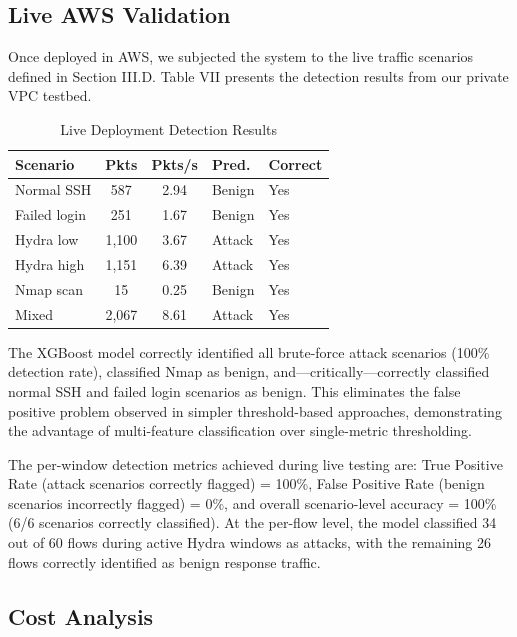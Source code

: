 \documentclass[conference]{IEEEtran}
\begin{document}
\subsection{Live AWS Validation}

Once deployed in AWS, we subjected the system to the live traffic scenarios defined in Section III.D. Table VII presents the detection results from our private VPC testbed.

\begin{table}[!ht]
\centering
\caption{Live Deployment Detection Results}
\footnotesize
\setlength{\tabcolsep}{2pt}
\begin{tabulary}{\linewidth}{|l|c|c|l|l|}
\hline
\textbf{Scenario} & \textbf{Pkts} & \textbf{Pkts/s} & \textbf{Pred.} & \textbf{Correct} \\
\hline
Normal SSH & 587 & 2.94 & Benign & Yes \\
Failed login & 251 & 1.67 & Benign & Yes \\
Hydra low & 1,100 & 3.67 & Attack & Yes \\
Hydra high & 1,151 & 6.39 & Attack & Yes \\
Nmap scan & 15 & 0.25 & Benign & Yes \\
Mixed & 2,067 & 8.61 & Attack & Yes \\
\hline
\end{tabulary}
\end{table}

The XGBoost model correctly identified all brute-force attack scenarios (100\% detection rate), classified Nmap as benign, and---critically---correctly classified normal SSH and failed login scenarios as benign. This eliminates the false positive problem observed in simpler threshold-based approaches, demonstrating the advantage of multi-feature classification over single-metric thresholding.

The per-window detection metrics achieved during live testing are: True Positive Rate (attack scenarios correctly flagged) = 100\%, False Positive Rate (benign scenarios incorrectly flagged) = 0\%, and overall scenario-level accuracy = 100\% (6/6 scenarios correctly classified). At the per-flow level, the model classified 34 out of 60 flows during active Hydra windows as attacks, with the remaining 26 flows correctly identified as benign response traffic.

\subsection{Cost Analysis}
\end{document}
